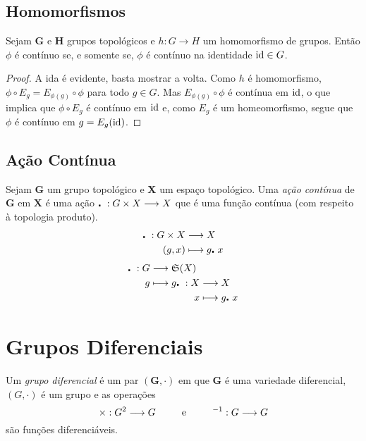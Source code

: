 \subsection{Homomorfismos}

\begin{prop}
Sejam $\bm G$ e $\bm H$ grupos topológicos e $h: G \to H$ um homomorfismo de grupos. Então $\phi$ é contínuo se, e somente se, $\phi$ é contínuo na identidade $\mathrm{id} \in G$.
\end{prop}
\begin{proof}
A ida é evidente, basta mostrar a volta. Como $h$ é homomorfismo, $\phi \circ E_g = E_{\phi(g)} \circ \phi$ para todo $g \in G$. Mas $E_{\phi(g)} \circ \phi$ é contínua em $\mathrm{id}$, o que implica que $\phi \circ E_g$ é contínuo em $\mathrm{id}$ e, como $E_g$ é um homeomorfismo, segue que $\phi$ é contínuo em $g=E_g(\mathrm{id})$.
\end{proof}

\subsection{Ação Contínua}

\begin{defi}
Sejam $\bm G$ um grupo topológico e $\bm X$ um espaço topológico. Uma \emph{ação contínua} de $\bm G$ em $\bm X$ é uma ação $\mathord{\centerdot}\ : G \times X \longrightarrow X$ que é uma função contínua (com respeito à topologia produto).
	\begin{align*}
	{\mathord{\centerdot}\ }: {G \times X} &\longrightarrow {X} \\{(g,x)} &\longmapsto {g \mathord{\centerdot}\ x}
	\end{align*}
	\begin{align*}
	{\mathord{\centerdot}\ }: {G} &\longrightarrow {\mathfrak{S}(X)} \\{g} &\longmapsto {
		\begin{aligned}[t]
		 {g\mathord{\centerdot}\ }: {X} &\longrightarrow{X} \\{x} &\longmapsto{g\mathord{\centerdot}\ x} 
		\end{aligned}	
	}
	\end{align*}
\end{defi}


\section{Grupos Diferenciais}

\begin{defi}
Um \emph{grupo diferencial} é um par $(\bm G,\cdot)$ em que $\bm G$ é uma variedade diferencial, $(G,\cdot)$ é um grupo e as operações
	\begin{equation*}
	\times: G^2 \longrightarrow G \qquad\text{\ \ e\ \ }\qquad ^{-1}: G \longrightarrow G
	\end{equation*}
são funções diferenciáveis.
\end{defi}

